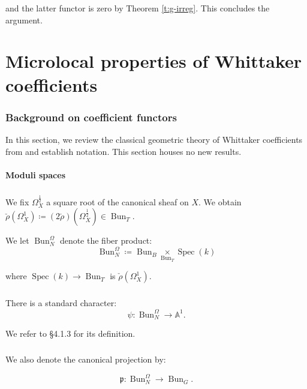 \documentclass[reqno,11pt]{amsart}
\numberwithin{equation}{subsection}
\theoremstyle{remark}
\newcommand{\bA}{{\mathbb A}}
\newcommand{\fp}{{\mathfrak p}}
\newcommand{\on}{\operatorname}
\newcommand{\Spec}{\on{Spec}}
\newcommand{\Bun}{\on{Bun}}
\begin{document}
\noindent and the latter functor is zero by Theorem \ref{t:g-irreg}.
This concludes the argument.

\part{Microlocal properties of Whittaker coefficients}

\section{Background on coefficient functors}\label{s:coeff-backround}

In this section, we review the classical geometric theory
of Whittaker coefficients from \cite{fgv} and establish notation.
This section houses no new results.

\subsection{Moduli spaces}

\subsubsection{}

We fix $\Omega_X^{\frac{1}{2}}$ a square root of the canonical sheaf on $X$.
We obtain $\check{\rho}(\Omega_X^1) \coloneqq (2\check{\rho})(\Omega_X^{\frac{1}{2}}) 
\in \Bun_T$.

We let $\Bun_N^{\Omega}$ denote the fiber product:
%
\[
\Bun_N^{\Omega} \coloneqq \Bun_B \underset{\Bun_T}{\times} \Spec(k)
\]

\noindent where $\Spec(k) \to \Bun_T$ is $\check{\rho}(\Omega_X^1)$.

\subsubsection{}

There is a standard character:
%
\[
\psi:\Bun_N^{\Omega} \to \bA^1.
\]

\noindent We refer to \cite{fgv} \S 4.1.3 for its definition.

\subsubsection{}

We also denote the canonical projection by:

\[
\fp:\Bun_N^{\Omega} \to \Bun_G.
\]
\end{document}
